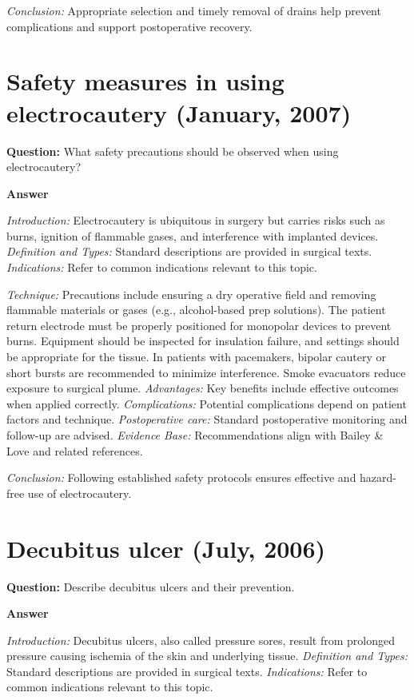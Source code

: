 \documentclass{article}
\begin{document}
\emph{Conclusion:} Appropriate selection and timely removal of drains help prevent complications and support postoperative recovery.


\section{Safety measures in using electrocautery (January, 2007)}

\textbf{Question:} What safety precautions should be observed when using electrocautery?

\textbf{Answer}

\emph{Introduction:} Electrocautery is ubiquitous in surgery but carries risks such as burns, ignition of flammable gases, and interference with implanted devices.
\emph{Definition and Types:} Standard descriptions are provided in surgical texts.
\emph{Indications:} Refer to common indications relevant to this topic.

\emph{Technique:} Precautions include ensuring a dry operative field and removing flammable materials or gases (e.g., alcohol-based prep solutions). The patient return electrode must be properly positioned for monopolar devices to prevent burns. Equipment should be inspected for insulation failure, and settings should be appropriate for the tissue. In patients with pacemakers, bipolar cautery or short bursts are recommended to minimize interference. Smoke evacuators reduce exposure to surgical plume.
\emph{Advantages:} Key benefits include effective outcomes when applied correctly.
\emph{Complications:} Potential complications depend on patient factors and technique.
\emph{Postoperative care:} Standard postoperative monitoring and follow-up are advised.
\emph{Evidence Base:} Recommendations align with Bailey & Love and related references.

\emph{Conclusion:} Following established safety protocols ensures effective and hazard-free use of electrocautery.


\section{Decubitus ulcer (July, 2006)}

\textbf{Question:} Describe decubitus ulcers and their prevention.

\textbf{Answer}

\emph{Introduction:} Decubitus ulcers, also called pressure sores, result from prolonged pressure causing ischemia of the skin and underlying tissue.
\emph{Definition and Types:} Standard descriptions are provided in surgical texts.
\emph{Indications:} Refer to common indications relevant to this topic.
\end{document}
